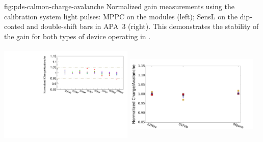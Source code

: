\begin{dunefigure}
 {fig:pds-calmon-charge-avalanche}
 {Normalized gain measurements using the calibration system light pulses: MPPC  on the  modules (left); SensL  on the dip-coated and double-shift bars in APA~3 (right). This demonstrates the stability of the gain for both types of device operating in \lar.}
  \includegraphics[height=5.5cm,width=0.48\textwidth]{graphics/pds-arapuca-calibration-stability.pdf}
  \includegraphics[height=5.5cm,width=0.48\textwidth]{graphics/pds-avg-mean-adc-led-apa3-sensl.pdf}
\end{dunefigure}

